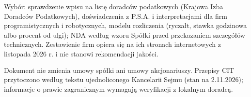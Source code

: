 \documentclass[11pt,a4paper]{report}
\begin{document}
Wybór: sprawdzenie wpisu na listę doradców podatkowych (Krajowa Izba Doradców Podatkowych), doświadczenia z P.S.A. i interpretacjami dla firm programistycznych i robotycznych, modelu rozliczenia (ryczałt, stawka godzinowa albo procent od ulgi); NDA według wzoru Spółki przed przekazaniem szczegółów technicznych. Zestawienie firm opiera się na ich stronach internetowych z listopada 2026 r. i nie stanowi rekomendacji jakości.

\vspace{1em}
{\small Dokument nie zmienia umowy spółki ani umowy akcjonariuszy. Przepisy CIT przytoczono według tekstu ujednoliconego Kancelarii Sejmu (stan na 2.11.2026); informacje o prawie zagranicznym wymagają weryfikacji z lokalnym doradcą.\par}
\end{document}

